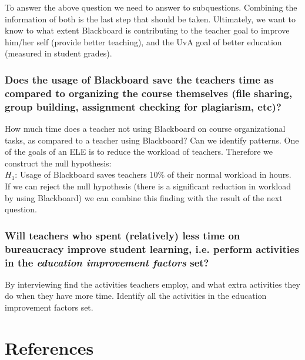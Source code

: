 To answer the above question we need to answer to subquestions. Combining the information of both is the last step that should be taken. Ultimately, we want to know to what extent Blackboard is contributing to the teacher goal to improve him/her self (provide better teaching), and the UvA goal of better education (measured in student grades).

\subsection{Does the usage of Blackboard save the teachers time as compared to organizing the course themselves (file sharing, group building, assignment checking for plagiarism, etc)?}

How much time does a teacher not using Blackboard on course organizational tasks, as compared to a teacher using Blackboard? Can we identify patterns. One of the goals of an ELE is to reduce the workload of teachers. Therefore we construct the null hypothesis: \\

$H_1$: Usage of Blackboard saves teachers $10\%$ of their normal workload in hours. \\

If we can reject the null hypothesis (there is a significant reduction in workload by using Blackboard) we can combine this finding with the result of the next question. 

\subsection{Will teachers who spent (relatively) less time on bureaucracy improve student learning, i.e. perform activities in the \textit{education improvement factors} set?}


By interviewing find the activities teachers employ, and what extra activities they do when they have more time. Identify all the activities in the education improvement factors set. 




\chapter{References}

